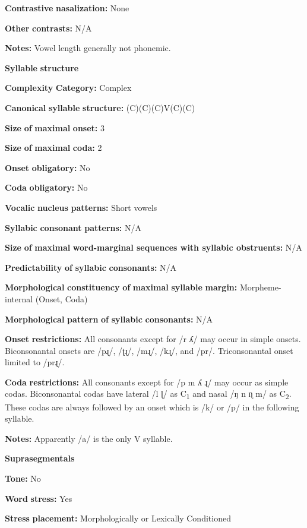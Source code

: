 \textbf{Contrastive} \textbf{nasalization:} None

\textbf{Other} \textbf{contrasts:} N/A

\textbf{Notes:} Vowel length generally not phonemic.

\textbf{Syllable} \textbf{structure}

\textbf{Complexity} \textbf{Category:} Complex

\textbf{Canonical} \textbf{syllable} \textbf{structure:} (C)(C)(C)V(C)(C) \citep[23-6]{Rumsey1978}

\textbf{Size} \textbf{of} \textbf{maximal} \textbf{onset:} 3

\textbf{Size} \textbf{of} \textbf{maximal} \textbf{coda:} 2

\textbf{Onset} \textbf{obligatory:} No

\textbf{Coda} \textbf{obligatory:} No

\textbf{Vocalic} \textbf{nucleus} \textbf{patterns:} Short vowels

\textbf{Syllabic} \textbf{consonant} \textbf{patterns:} N/A

\textbf{Size} \textbf{of} \textbf{maximal} \textbf{word{}-marginal sequences with syllabic obstruents:} N/A

\textbf{Predictability} \textbf{of} \textbf{syllabic} \textbf{consonants:} N/A

\textbf{Morphological} \textbf{constituency} \textbf{of} \textbf{maximal} \textbf{syllable} \textbf{margin:} Morpheme-internal (Onset, Coda)

\textbf{Morphological} \textbf{pattern} \textbf{of} \textbf{syllabic} \textbf{consonants:} N/A

\textbf{Onset} \textbf{restrictions:} All consonants except for /r ʎ/ may occur in simple onsets. Biconsonantal onsets are /pɻ/, /ʈɻ/, /mɻ/, /kɻ/, and /pr/. Triconsonantal onset limited to /prɻ/.

\textbf{Coda} \textbf{restrictions:} All consonants except for /p m ʎ ɻ/ may occur as simple codas. Biconsonantal codas have lateral /l ɭ/ as C\textsubscript{1} and nasal /ŋ n ɳ m/ as C\textsubscript{2}. These codas are always followed by an onset which is /k/ or /p/ in the following syllable.

\textbf{Notes:} Apparently /a/ is the only V syllable.

\textbf{Suprasegmentals}

\textbf{Tone:} No

\textbf{Word} \textbf{stress:} Yes

\textbf{Stress} \textbf{placement:} Morphologically or Lexically Conditioned

